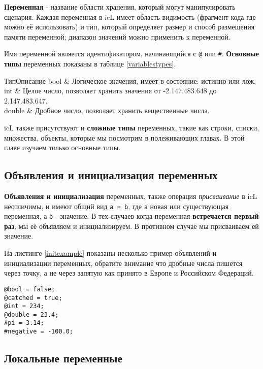 \documentclass[a4paper, 14pt]{extarticle}
\begin{document}
\textbf{Переменная} - название области хранения, который могут манипулировать сценария. Каждая переменная в icL имеет область видимость (фрагмент кода где можно её использовать) и тип, который определяет размер и способ размещения памяти переменной; диапазон значений можно применить к переменной.
	
Имя переменной является идентификатором, начинающийся с \lstinline`@` или {\color{blue2}\lstinline`#`}.
\textbf{Основные типы} переменных показаны в таблице \ref{variablestypes}.

%
{Тип}{Описание}%
{ 
	bool & Логическое значения, имеет в состояние: истинно или лож. \\ \hline
	int & Целое число, позволяет хранить значения от -2.147.483.648 до 2.147.483.647. \\ \hline
	double & Дробное число, позволяет хранить вещественные числа. \\
}
	
icL также присутствуют и \textbf{сложные типы} переменных, такие как строки, списки, множества, объекты, которые мы посмотрим в полеживающих главах. В этой главе изучаем только основные типы.
	
\subsection{Объявления и инициализация переменных}
	
\textbf{Объявления и инициализация} переменных, также операция \textit{присваивание} в icL неотличимы, и имеют общий вид \lstinline`a = b`, где \lstinline`a` новая или существующая переменная, а \lstinline`b` - значение. В тех случаев когда переменная \textbf{встречается первый раз}, мы её объявляем и инициализируем. В противном случае мы присваиваем ей значение.
	
На листинге \ref{initexample} показаны несколько пример объявлений и инициализации переменных, обратите внимание что дробные числа пишется через точку, а не через запятую как принято в Европе и Российском Федераций.
  	
\begin{lstlisting}[caption=Пример объявлений и инициализации переменных,label=initexample]
@bool = false;
@catched = true;
@int = 234;
@double = 23.4;
#pi = 3.14;
#negative = -100.0;
\end{lstlisting}

\subsection{Локальные переменные}
	
\end{document}
